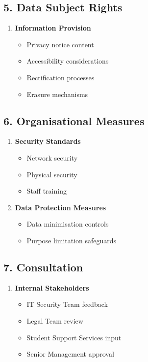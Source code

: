 \documentclass[14pt,a4paper]{article}
\begin{document}
\begin{multicols}{2}
\subsection*{5. Data Subject Rights}
\begin{enumerate}
    \item \textbf{Information Provision}
    \begin{itemize}
        \item Privacy notice content
        \item Accessibility considerations
        \item Rectification processes
        \item Erasure mechanisms
    \end{itemize}
\end{enumerate}

\subsection*{6. Organisational Measures}
\begin{enumerate}
    \item \textbf{Security Standards}
    \begin{itemize}
        \item Network security
        \item Physical security
        \item Staff training
    \end{itemize}

    \item \textbf{Data Protection Measures}
    \begin{itemize}
        \item Data minimisation controls
        \item Purpose limitation safeguards
    \end{itemize}
\end{enumerate}

\subsection*{7. Consultation}
\begin{enumerate}
    \item \textbf{Internal Stakeholders}
    \begin{itemize}
        \item IT Security Team feedback
        \item Legal Team review
        \item Student Support Services input
        \item Senior Management approval
    \end{itemize}


\end{enumerate}
\end{multicols}
\end{document}
